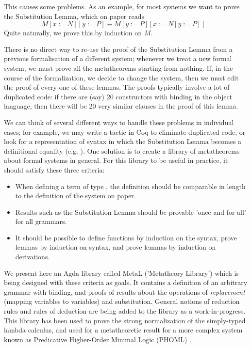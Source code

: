 \documentclass[envcountsame]{llncs}
\begin{document}
This causes some problems.  As an example, for most systems we want to prove the Substitution Lemma, which on paper reads
\[ M [x := N] [y := P] \equiv M [y:=P] [x:=N[y:=P]] \enspace . \]
Quite naturally, we prove this by induction on $M$.

There is no direct way to re-use the proof of the Substitution Lemma from a previous formalisation of a different system; whenever we treat a new formal system, we
must prove all the metatheorems starting from nothing.  If, in the course of the formalization, we decide to change the system, then we must edit the proof of every one
of these lemmas.  The proofs typically involve a lot of duplicated code: if there are (say) 20 constructors with binding in the object language, then there will
be 20 very similar clauses in the proof of this lemma.

We can think of several different ways to handle these problems in individual cases; for example, we may write a tactic in Coq to eliminate duplicated code, or look for a representation
of syntax in which the Substitution Lemma becomes a definitional equality (e.g. \cite{McBridea}).  One solution is to create a library of metatheorems about
formal systems in general.  For this library to be useful in practice, it should satisfy these three criteria:
\begin{itemize}
 \item 
 When defining a term of type , the definition should be comparable in length to the definition of the system on paper.
 \item
 Results such as the Substitution Lemma should be provable 'once and for all' for all grammars.
 \item
 It should be possible to define functions by induction on the syntax, prove lemmas by induction on syntax, and prove lemmas by induction on derivations.
\end{itemize}

We present here an Agda library called MetaL ('Metatheory Library') which is being designed with these criteria as goals.  It contains
a definition of an arbitrary grammar with binding, and proofs of results about the operations of \emph{replacement} (mapping variables to variables) and substitution.
General notions of reduction rules and rules of deduction are being added to the library as a work-in-progress.  This library has been used
to prove the strong normalization of the simply-typed lambda calculus, and used for a metatheoretic result for a more complex system known
as Predicative Higher-Order Minimal Logic (PHOML) \cite{DBLP:journals/corr/AdamsBC16}.
\end{document}
